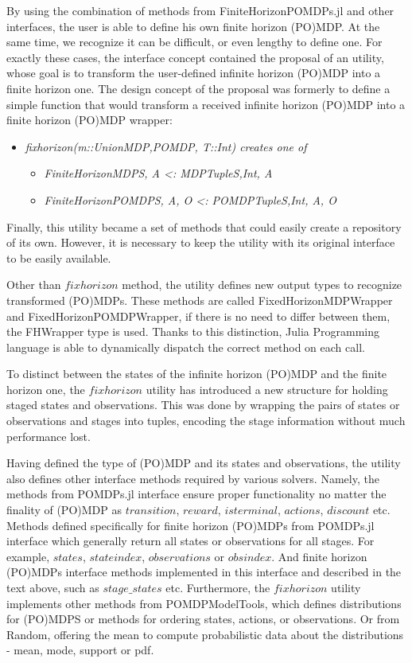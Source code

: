 By using the combination of methods from FiniteHorizonPOMDPs.jl and other interfaces, the user is able to define his own finite horizon (PO)MDP. At the same time, we recognize it can be difficult, or even lengthy to define one. For exactly these cases, the interface concept contained the proposal of an utility, whose goal is to transform the user-defined infinite horizon (PO)MDP into a finite horizon one.  The design concept of the proposal was formerly to define a simple function that would transform a received infinite horizon (PO)MDP into a finite horizon (PO)MDP wrapper:

\begin{itemize}
    \item \textit{fixhorizon(m::Union{MDP,POMDP}, T::Int) creates one of}
    \begin{itemize}
        \item \textit{FiniteHorizonMDP{S, A} <: MDP{Tuple{S,Int}, A}}
        \item \textit{FiniteHorizonPOMDP{S, A, O} <: POMDP{Tuple{S,Int}, A, O}}
    \end{itemize}
\end{itemize}

Finally, this utility became a set of methods that could easily create a repository of its own. However, it is necessary to keep the utility with its original interface to be easily available. 

Other than $fixhorizon$ method, the utility defines new output types to recognize transformed (PO)MDPs. These methods are called FixedHorizonMDPWrapper and FixedHorizonPOMDPWrapper, if there is no need to differ between them, the FHWrapper type is used. Thanks to this distinction, Julia Programming language is able to dynamically dispatch the correct method on each call.

To distinct between the states of the infinite horizon (PO)MDP and the finite horizon one, the $fixhorizon$ utility has introduced a new structure for holding staged states and observations. This was done by wrapping the pairs of states or observations and stages into tuples, encoding the stage information without much performance lost.

Having defined the type of (PO)MDP and its states and observations, the utility also defines other interface methods required by various solvers. Namely, the methods from POMDPs.jl interface ensure proper functionality no matter the finality of (PO)MDP as $transition$, $reward$, $isterminal$, $actions$, $discount$ etc. Methods defined specifically for finite horizon (PO)MDPs from POMDPs.jl interface which generally return all states or observations for all stages. For example, $states$, $stateindex$, $observations$ or $obsindex$. And finite horizon (PO)MDPs interface methods implemented in this interface and described in the text above, such as $stage\_states$ etc. Furthermore, the $fixhorizon$ utility implements other methods from POMDPModelTools, which defines distributions for (PO)MDPS or methods for ordering states, actions, or observations. Or from Random, offering the mean to compute probabilistic data about the distributions - mean, mode, support or pdf.

